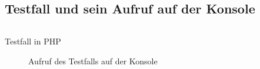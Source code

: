 \subsection{Testfall und sein Aufruf auf der Konsole}
\label{app:Test}
\begin{listing}
  \inputminted{php}{Listings/tests.php}
  \caption{Testfall in PHP}
\end{listing}
\clearpage
\begin{figure}[htb]
\centering
{}
\caption{Aufruf des Testfalls auf der Konsole}
\end{figure}
